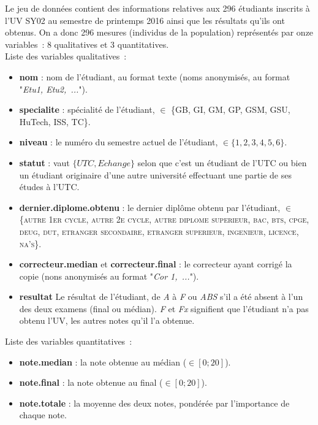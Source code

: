 \documentclass[a4paper,11pt]{report}
\begin{document}
Le jeu de données contient des informations relatives aux 296 étudiants inscrits à l’UV SY02 au semestre de printemps 2016 ainsi que les résultats qu'ils ont obtenus. On a donc 296 mesures (individus de la population) représentés par onze variables~: 8 qualitatives et 3 quantitatives.\\
Liste des variables qualitatives~:
\begin{itemize}
	\item \textbf{nom} : nom de l'étudiant, au format texte (noms anonymisés, au format "\textit{Etu1, Etu2,~...}").
	\item \textbf{specialite} : spécialité de l'étudiant, $\in$ \{GB, GI, GM, GP, GSM, GSU, HuTech, ISS, TC\}.
	\item \textbf{niveau} : le numéro du semestre actuel de l'étudiant, $\in \{1,2,3,4,5,6\}$.
	\item \textbf{statut} : vaut $ \{UTC,Echange\} $ selon que c'est un étudiant de l'UTC ou bien un étudiant originaire d'une autre université effectuant une partie de ses études à l'UTC.
	\item \textbf{dernier.diplome.obtenu} : le dernier diplôme obtenu par l'étudiant, $\in$ \{\textsc{autre 1er cycle, autre 2e cycle, autre diplome superieur, bac, bts, cpge, deug, dut, etranger secondaire, etranger superieur, ingenieur, licence, na's}\}.
	\item \textbf{correcteur.median} et \textbf{correcteur.final} : le correcteur ayant corrigé la copie (nons anonymisés au format "\textit{Cor 1,~...}").
	\item \textbf{resultat} Le résultat de l'étudiant, de \textit{A} à \textit{F} ou \textit{ABS} s'il a été absent à l'un des deux examens (final ou médian). \textit{F} et \textit{Fx} signifient que l'étudiant n'a pas obtenu l'UV, les autres notes qu'il l'a obtenue.
\end{itemize}
Liste des variables quantitatives~:
\begin{itemize}
	\item \textbf{note.median} : la note obtenue au médian ($ \in [0;20] $).
	\item \textbf{note.final} : la note obtenue au final ($ \in [0;20] $).
	\item \textbf{note.totale} : la moyenne des deux notes, pondérée par l'importance de chaque note.
\end{itemize}
\end{document}
